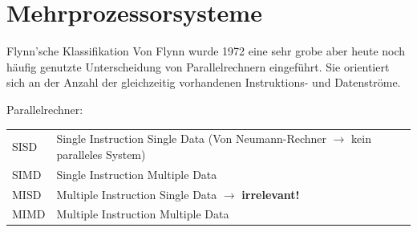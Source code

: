 \section{Mehrprozessorsysteme}

\begin{defi}{Flynn'sche Klassifikation}
    Von Flynn wurde 1972 eine sehr grobe aber heute noch häufig genutzte Unterscheidung von Parallelrechnern eingeführt.
    Sie orientiert sich an der Anzahl der gleichzeitig vorhandenen Instruktions- und Datenströme.
    
    Parallelrechner:
    
    \begin{center}
        \begin{tabular}{ll}
            SISD & Single Instruction Single Data (Von Neumann-Rechner $\to$ kein paralleles System) \\
            SIMD & Single Instruction Multiple Data                                                  \\
            MISD & Multiple Instruction Single Data $\to$ \textbf{irrelevant!}                       \\
            MIMD & Multiple Instruction Multiple Data 
        \end{tabular}
    \end{center}
\end{defi}

